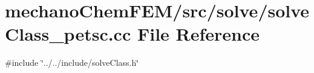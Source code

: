 \section{mechano\+Chem\+F\+E\+M/src/solve/solve\+Class\+\_\+petsc.cc File Reference}
\label{solve_class__petsc_8cc}
{\ttfamily \#include \char`\"{}../../include/solve\+Class.\+h\char`\"{}}\newline
